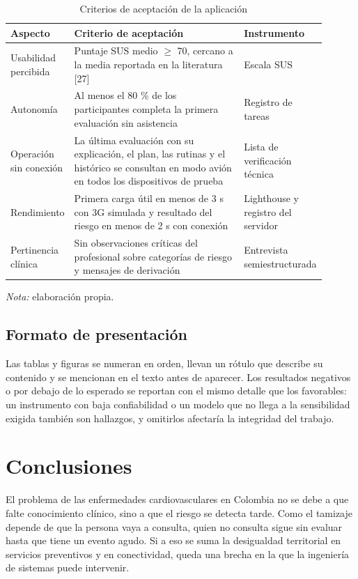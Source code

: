 \documentclass[conference]{IEEEtran}
\begin{document}
\begin{table}[!t]
\centering
\caption{Criterios de aceptación de la aplicación}
\footnotesize
\renewcommand{\arraystretch}{1.15}
\begin{tabular}{>{\raggedright\arraybackslash}p{0.110\linewidth}>{\raggedright\arraybackslash}p{0.641\linewidth}>{\raggedright\arraybackslash}p{0.151\linewidth}}
\hline
\textbf{Aspecto} & \textbf{Criterio de aceptación} & \textbf{Instrumento} \\ \hline
Usabilidad percibida & Puntaje SUS medio $\geq$ 70, cercano a la media reportada en la literatura [27] & Escala SUS \\ \hline
Autonomía & Al menos el 80 \% de los participantes completa la primera evaluación sin asistencia & Registro de tareas \\ \hline
Operación sin conexión & La última evaluación con su explicación, el plan, las rutinas y el histórico se consultan en modo avión en todos los dispositivos de prueba & Lista de verificación técnica \\ \hline
Rendimiento & Primera carga útil en menos de 3 s con 3G simulada y resultado del riesgo en menos de 2 s con conexión & Lighthouse y registro del servidor \\ \hline
Pertinencia clínica & Sin observaciones críticas del profesional sobre categorías de riesgo y mensajes de derivación & Entrevista semiestructurada \\ \hline
\end{tabular}
\par\smallskip\parbox{\linewidth}{\scriptsize\textit{Nota:} elaboración propia.}
\end{table}
\subsection{Formato de presentación}
Las tablas y figuras se numeran en orden, llevan un rótulo que describe su contenido y se mencionan en el texto antes de aparecer. Los resultados negativos o por debajo de lo esperado se reportan con el mismo detalle que los favorables: un instrumento con baja confiabilidad o un modelo que no llega a la sensibilidad exigida también son hallazgos, y omitirlos afectaría la integridad del trabajo.

\section{Conclusiones}
El problema de las enfermedades cardiovasculares en Colombia no se debe a que falte conocimiento clínico, sino a que el riesgo se detecta tarde. Como el tamizaje depende de que la persona vaya a consulta, quien no consulta sigue sin evaluar hasta que tiene un evento agudo. Si a eso se suma la desigualdad territorial en servicios preventivos y en conectividad, queda una brecha en la que la ingeniería de sistemas puede intervenir.
\end{document}
